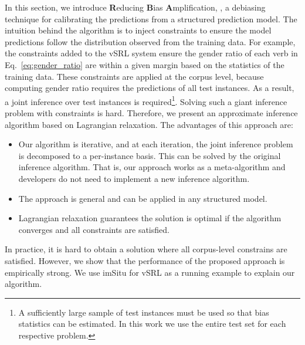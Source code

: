 In this section, we introduce {\bf R}educing {\bf B}ias {\bf A}mplification, \alg{}, a debiasing technique for calibrating the predictions from a structured prediction model.
The intuition behind the algorithm is to inject constraints to ensure the model predictions follow the distribution observed from the training data.
For example, the constraints added to the vSRL system ensure the gender ratio of each verb in Eq.~\eqref{eq:gender_ratio} are within a given margin based on the statistics of the training data.
These constraints are applied at the corpus level, because computing gender ratio requires the predictions of all test instances.
As a result, a joint inference over test instances is required\footnote{A sufficiently large sample of test instances must be used so that bias statistics can be estimated. In this work we use the entire test set for each respective problem. }.
Solving such a giant inference problem with constraints is hard.
Therefore, we present an approximate inference algorithm based on Lagrangian relaxation. The advantages of this approach are:
\begin{itemize}
    \item Our algorithm is iterative, and at each iteration, the joint inference problem is decomposed to a per-instance basis. This can be solved by the original inference algorithm. That is, our approach works as a meta-algorithm and developers do not need to implement a new inference algorithm. 
    
    \item The approach is general and can be applied in any structured model. 
    
    \item Lagrangian relaxation guarantees the solution is optimal if the algorithm converges and all constraints are satisfied. 
\end{itemize}
In practice, it is hard to obtain a solution where all corpus-level constrains are satisfied. However, we show that the performance of the proposed approach is empirically strong.
We use imSitu for vSRL as a running example to explain our algorithm. 



